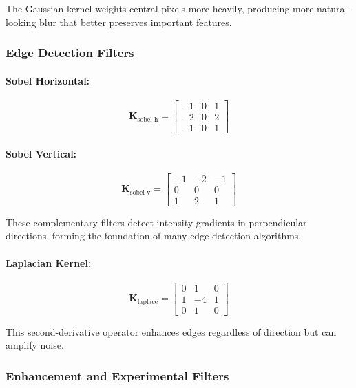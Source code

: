 \documentclass[12pt,a4paper]{article}
\newcommand{\kernel}[1]{\mathbf{K}_{\text{#1}}}
\begin{document}
	The Gaussian kernel weights central pixels more heavily, producing more natural-looking blur that better preserves important features.
	
	\subsubsection{Edge Detection Filters}
	
	\paragraph{Sobel Horizontal:}
	\begin{equation}
		\kernel{sobel-h} = \begin{bmatrix} 
			-1 & 0 & 1 \\
			-2 & 0 & 2 \\
			-1 & 0 & 1
		\end{bmatrix}
	\end{equation}
	
	\paragraph{Sobel Vertical:}
	\begin{equation}
		\kernel{sobel-v} = \begin{bmatrix} 
			-1 & -2 & -1 \\
			0 & 0 & 0 \\
			1 & 2 & 1
		\end{bmatrix}
	\end{equation}
	
	These complementary filters detect intensity gradients in perpendicular directions, forming the foundation of many edge detection algorithms.
	
	\paragraph{Laplacian Kernel:}
	\begin{equation}
		\kernel{laplace} = \begin{bmatrix} 
			0 & 1 & 0 \\
			1 & -4 & 1 \\
			0 & 1 & 0
		\end{bmatrix}
	\end{equation}
	
	This second-derivative operator enhances edges regardless of direction but can amplify noise.
	
	\subsubsection{Enhancement and Experimental Filters}
	
\end{document}

